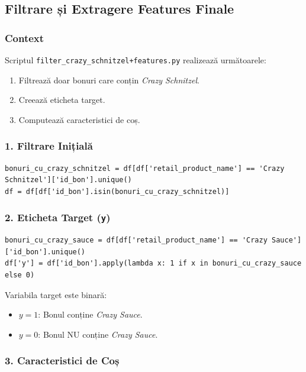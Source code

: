 \documentclass[12pt,a4paper]{article}
\begin{document}
\subsection{Filtrare și Extragere Features Finale}

\subsubsection*{Context}

Scriptul \texttt{filter\_crazy\_schnitzel+features.py} realizează următoarele:

\begin{enumerate}
    \item Filtrează doar bonuri care conțin \textit{Crazy Schnitzel}.
    \item Creează eticheta target.
    \item Computează caracteristici de coș.
\end{enumerate}

\subsubsection*{1. Filtrare Inițială}

\begin{lstlisting}
bonuri_cu_crazy_schnitzel = df[df['retail_product_name'] == 'Crazy Schnitzel']['id_bon'].unique()
df = df[df['id_bon'].isin(bonuri_cu_crazy_schnitzel)]
\end{lstlisting}

\subsubsection*{2. Eticheta Target (\texttt{y})}

\begin{lstlisting}
bonuri_cu_crazy_sauce = df[df['retail_product_name'] == 'Crazy Sauce']['id_bon'].unique()
df['y'] = df['id_bon'].apply(lambda x: 1 if x in bonuri_cu_crazy_sauce else 0)
\end{lstlisting}

Variabila target este binară:

\begin{itemize}
    \item $y = 1$: Bonul conține \textit{Crazy Sauce}.
    \item $y = 0$: Bonul NU conține \textit{Crazy Sauce}.
\end{itemize}

\subsubsection*{3. Caracteristici de Coș}
\end{document}
